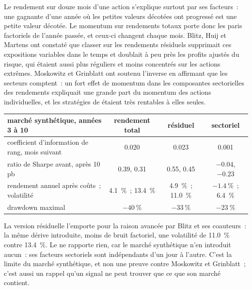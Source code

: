 Le rendement sur douze mois d'une action s'explique surtout par ses facteurs~: une gagnante d'une année où les petites valeurs décotées ont progressé est une petite valeur décotée. Le momentum
sur rendements totaux porte donc les paris factoriels de l'année passée, et ceux-ci changent chaque mois. Blitz, Huij et Martens ont constaté que classer sur les rendements résiduels supprimait
ces expositions variables dans le temps et doublait à peu près les profits ajustés du risque, qui étaient aussi plus réguliers et moins concentrés sur les actions extrêmes. Moskowitz et
Grinblatt ont soutenu l'inverse en affirmant que les secteurs comptent~: un fort effet de momentum dans les composantes sectorielles des rendements expliquait une grande part du momentum
des actions individuelles, et les stratégies de  étaient très rentables à elles seules.

\begin{center}
\small
\begin{tabular}{@{}lccc@{}}
\toprule
marché synthétique, années 3 à 10 & rendement total & résiduel & sectoriel\\
\midrule
coefficient d'information de rang, mois suivant & 0.020 & 0.023 & 0.001\\
ratio de Sharpe avant, après 10 pb & 0.39, 0.31 & 0.55, 0.45 & $-0.04$, $-0.23$\\
rendement annuel après coûts~; volatilité & 4.1~\%~; 13.4~\% & 4.9~\%~; 11.0~\% & $-1.4~\%$~; 6.4~\%\\
drawdown maximal & $-40~\%$ & $-33~\%$ & $-23~\%$\\
\bottomrule
\end{tabular}
\end{center}

La version résiduelle l'emporte pour la raison avancée par Blitz et ses coauteurs~: la même dérive introduite, moins de bruit factoriel, une volatilité de 11.0~\% contre 13.4~\%. Le  ne rapporte rien, car le marché synthétique n'en introduit aucun~: ses facteurs sectoriels sont indépendants d'un jour à l'autre. C'est la limite du marché synthétique,
et non une preuve contre Moskowitz et Grinblatt~; c'est aussi un rappel qu'un signal ne peut trouver que ce que son marché contient.

